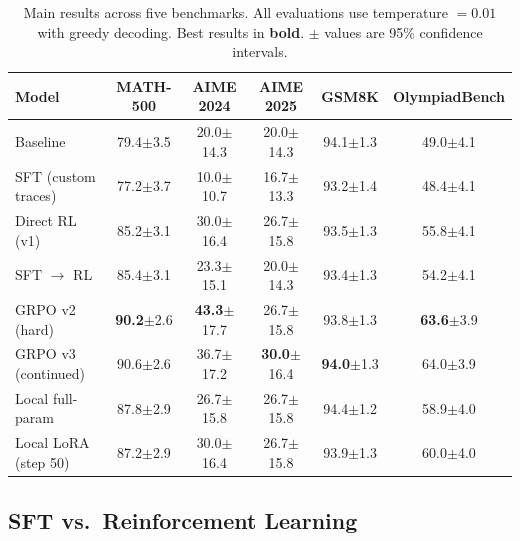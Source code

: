 \documentclass[11pt,a4paper]{article}
\begin{document}
\begin{table}[H]
\centering
\caption{Main results across five benchmarks. All evaluations use temperature $= 0.01$ with greedy decoding. Best results in \textbf{bold}. $\pm$ values are 95\% confidence intervals.}
\label{tab:main-results}
\small
\begin{tabular}{lccccc}
\toprule
\textbf{Model} & \textbf{MATH-500} & \textbf{AIME 2024} & \textbf{AIME 2025} & \textbf{GSM8K} & \textbf{OlympiadBench} \\
\midrule
Baseline & 79.4\scriptsize{$\pm$3.5} & 20.0\scriptsize{$\pm$14.3} & 20.0\scriptsize{$\pm$14.3} & 94.1\scriptsize{$\pm$1.3} & 49.0\scriptsize{$\pm$4.1} \\
SFT (custom traces) & 77.2\scriptsize{$\pm$3.7} & 10.0\scriptsize{$\pm$10.7} & 16.7\scriptsize{$\pm$13.3} & 93.2\scriptsize{$\pm$1.4} & 48.4\scriptsize{$\pm$4.1} \\
\midrule
Direct RL (v1) & 85.2\scriptsize{$\pm$3.1} & 30.0\scriptsize{$\pm$16.4} & 26.7\scriptsize{$\pm$15.8} & 93.5\scriptsize{$\pm$1.3} & 55.8\scriptsize{$\pm$4.1} \\
SFT $\rightarrow$ RL & 85.4\scriptsize{$\pm$3.1} & 23.3\scriptsize{$\pm$15.1} & 20.0\scriptsize{$\pm$14.3} & 93.4\scriptsize{$\pm$1.3} & 54.2\scriptsize{$\pm$4.1} \\
\midrule
GRPO v2 (hard) & \textbf{90.2}\scriptsize{$\pm$2.6} & \textbf{43.3}\scriptsize{$\pm$17.7} & 26.7\scriptsize{$\pm$15.8} & 93.8\scriptsize{$\pm$1.3} & \textbf{63.6}\scriptsize{$\pm$3.9} \\
GRPO v3 (continued) & 90.6\scriptsize{$\pm$2.6} & 36.7\scriptsize{$\pm$17.2} & \textbf{30.0}\scriptsize{$\pm$16.4} & \textbf{94.0}\scriptsize{$\pm$1.3} & 64.0\scriptsize{$\pm$3.9} \\
\midrule
Local full-param & 87.8\scriptsize{$\pm$2.9} & 26.7\scriptsize{$\pm$15.8} & 26.7\scriptsize{$\pm$15.8} & 94.4\scriptsize{$\pm$1.2} & 58.9\scriptsize{$\pm$4.0} \\
Local LoRA (step 50) & 87.2\scriptsize{$\pm$2.9} & 30.0\scriptsize{$\pm$16.4} & 26.7\scriptsize{$\pm$15.8} & 93.9\scriptsize{$\pm$1.3} & 60.0\scriptsize{$\pm$4.0} \\
\bottomrule
\end{tabular}
\end{table}

\subsection{SFT vs.\ Reinforcement Learning}
\label{sec:sft-vs-rl}
\end{document}
